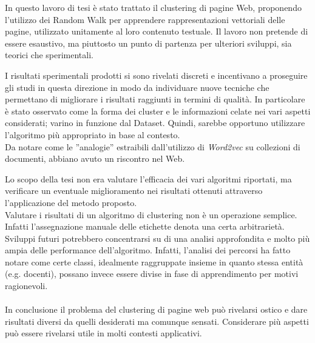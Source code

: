 
In questo lavoro di tesi è stato trattato il clustering di pagine Web, proponendo l'utilizzo dei Random Walk per apprendere rappresentazioni vettoriali delle pagine, utilizzato unitamente al loro contenuto testuale. Il lavoro non pretende di essere esaustivo, ma piuttosto un punto di partenza per ulteriori sviluppi, sia teorici che sperimentali. 

I risultati sperimentali prodotti si sono rivelati discreti e incentivano a proseguire gli studi in questa direzione in modo da individuare nuove tecniche che permettano di migliorare i risultati raggiunti in termini di qualità. 
In particolare è stato osservato come la forma dei cluster e le informazioni celate nei vari aspetti considerati; varino in funzione dal Dataset. Quindi, sarebbe opportuno utilizzare l'algoritmo più appropriato in base al contesto. 
\\
Da notare come le ''analogie'' estraibili dall'utilizzo di \textit{Word2vec} su collezioni di documenti, abbiano avuto un riscontro nel Web.

Lo scopo della tesi non era valutare l'efficacia dei vari algoritmi riportati, ma verificare un eventuale miglioramento nei risultati ottenuti attraverso l'applicazione del metodo proposto.
\\
Valutare i risultati di un algoritmo di clustering non è un operazione semplice. Infatti l'assegnazione manuale delle etichette denota una certa arbitrarietà. Sviluppi futuri potrebbero concentrarsi su di una analisi approfondita e molto più ampia delle performance dell'algoritmo.
Infatti, l'analisi dei percorsi ha fatto notare come certe classi, idealmente raggruppate insieme in quanto stessa entità (e.g. docenti), possano invece essere divise in fase di apprendimento per motivi ragionevoli.
\\\\
In conclusione il problema del clustering di pagine web può rivelarsi ostico e dare risultati diversi da quelli desiderati ma comunque sensati. Considerare più aspetti può essere rivelarsi utile in molti contesti applicativi.
